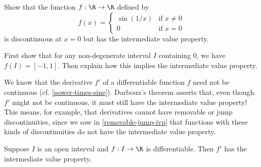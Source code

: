\begin{exercise} \label{discontinuous-ivp}
	Show that the function $f : \R \to \R$ defined by
	\[ f(x) = \begin{cases} \sin(1/x) & \text{if } x \neq 0 \\ 0 & \text{if } x = 0 \end{cases} \]
	is discontinuous at $x = 0$ but has the intermediate value property. \begin{hint} First show that for any non-degenerate interval $I$ containing 0, we have $f(I) = [-1,1]$. Then explain how this implies the intermediate value property. 
	\end{hint}
\end{exercise}

We know that the derivative $f'$ of a differentiable function $f$ need not be continuous (cf. \cref{power-times-sine}). Darboux's theorem asserts that, even though $f'$ might not be continuous, it must still have the intermediate value property! This means, for example, that derivatives cannot have removable or jump discontinuities, since we saw in  \cref{removable-jump-ivp} that functions with these kinds of discontinuities do not have the intermediate value property. 

\begin{theorem}[Darboux] \label{darboux}
	Suppose $I$ is an open interval and $f : I \to \R$ is differentiable. Then $f'$ has the intermediate value property. 
\end{theorem}

